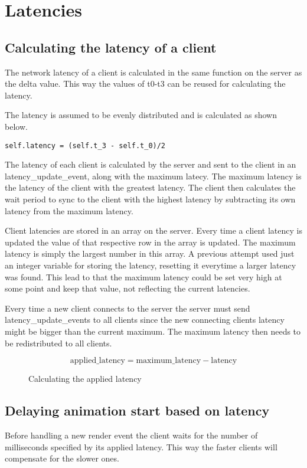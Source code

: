 \section{Latencies}

\subsection{Calculating the latency of a client}
The network latency of a client is calculated in the same function on the server as the delta value. This way the values of t0-t3 can be reused for calculating the latency. 

The latency is assumed to be evenly distributed and is calculated as shown below. 

\begin{verbatim}
self.latency = (self.t_3 - self.t_0)/2
\end{verbatim}

The latency of each client is calculated by the server and sent to the client in an latency\_update\_event, along with the maximum latecy. The maximum latency is the latency of the client with the greatest latency. The client then calculates the wait period to sync to the client with the highest latency by subtracting its own latency from the maximum latency.

Client latencies are stored in an array on the server. Every time a client latency is updated the value of that respective row in the array is updated. The maximum latency is simply the largest number in this array. A previous attempt used just an integer variable for storing the latency, resetting it everytime a larger latency was found. This lead to that the maximum latency could be set very high at some point and keep that value, not reflecting the current latencies. 

Every time a new client connects to the server the server must send latency\_update\_events to all clients since the new connecting clients latency might be bigger than the current maximum. The maximum latency then needs to be redistributed to all clients. 

\begin{figure}[h!]
	\begin{displaymath}
		\text{applied\_latency} = \text{maximum\_latency} - \text{latency}
	\end{displaymath}
	\caption{Calculating the applied latency}
	\label{fig:applatency}
\end{figure} 

\subsection{Delaying animation start based on latency}
Before handling a new render event the client waits for the number of milliseconds specified by its applied latency. This way the faster clients will compensate for the slower ones. 

